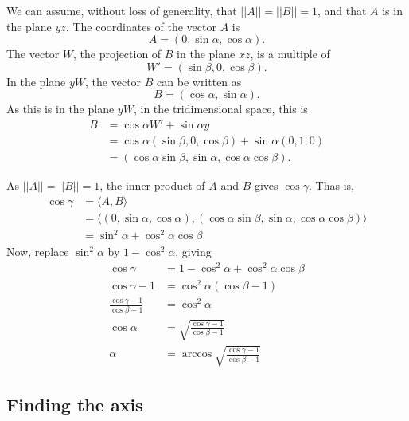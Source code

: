 \documentclass{article}
\begin{document}
We can assume, without loss of generality,
that $||A|| = ||B|| = 1$,
and that $A$ is in the plane $yz$.
The coordinates of the vector $A$ is
\begin{equation*}
    A = (0, \sin \alpha, \cos \alpha).
\end{equation*}
The vector $W$, the projection of $B$ in the plane $xz$,
is a multiple of
\begin{equation*}
    W' = (\sin \beta, 0, \cos \beta).
\end{equation*}
In the plane $yW$, the vector $B$ can be written as
\begin{equation*}
    B = (\cos \alpha, \sin \alpha).
\end{equation*}
As this is in the plane $yW$, in the tridimensional space,
this is
\begin{align*}
    B &= \cos \alpha W' + \sin \alpha y \\
      &= \cos \alpha (\sin \beta, 0, \cos \beta) + \sin \alpha (0, 1, 0) \\
      &= (\cos \alpha \sin \beta, \sin \alpha, \cos \alpha \cos \beta).
\end{align*}

As $||A|| = ||B|| = 1$, the inner product of $A$ and $B$ gives $\cos \gamma$.
Thas is,
\begin{align*}
    \cos \gamma &= \langle A, B \rangle \\
                &= \langle (0, \sin \alpha, \cos \alpha),
            (\cos \alpha \sin \beta, \sin \alpha, \cos \alpha \cos \beta) \rangle \\
                &= \sin^2 \alpha + \cos^2 \alpha \cos \beta
\end{align*}
Now, replace $\sin^2 \alpha$ by $1 - \cos^2 \alpha$, giving
\begin{align*}
    \cos \gamma &= 1 - \cos^2 \alpha + \cos^2 \alpha \cos \beta \\
    \cos \gamma - 1 &= \cos^2 \alpha( \cos \beta - 1 ) \\
    \frac{\cos \gamma - 1}{\cos \beta - 1} &= \cos^2 \alpha \\
    \cos \alpha &= \sqrt{\frac{\cos \gamma - 1}{\cos \beta - 1}} \\
    \alpha &= \arccos \sqrt{\frac{\cos \gamma - 1}{\cos \beta - 1}}
\end{align*}

\subsection{Finding the axis}
\end{document}
